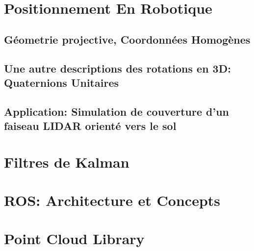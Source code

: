 \documentclass[12pt,a4paper]{report}
\begin{document}
\begin{appendix}
	\chapter{Positionnement En Robotique}
		\section{Géometrie projective, Coordonnées Homogènes}
		\section{Une autre descriptions des rotations en 3D: Quaternions Unitaires}
		\section{Application: Simulation de couverture d'un faiseau LIDAR orienté vers le sol}
	
	\chapter{Filtres de Kalman}
	
	\chapter{ROS: Architecture et Concepts}
	
	\chapter{Point Cloud Library}

\end{appendix}



\end{document}
